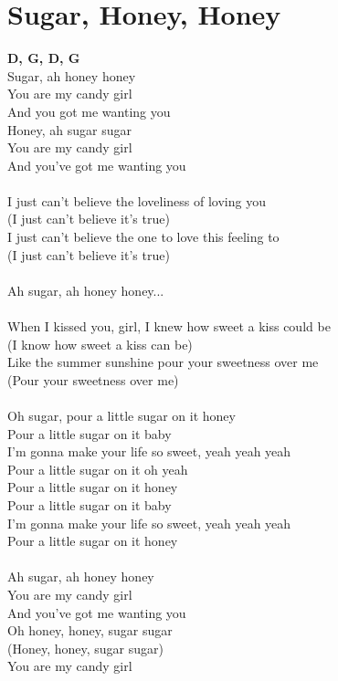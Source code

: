 \section{Sugar, Honey, Honey}
\footnotesize\textbf{D, G, D, G}\\
\normalsize
{}Sugar, ah honey honey\\
You are my candy girl\\
And you got me wanting you\\
Honey, ah sugar sugar\\
You are my candy girl\\
And you've got me wanting you\\
\\
I just can't believe the loveliness of loving you\\
(I just can't believe it's true)\\
I just can't believe the one to love this feeling to\\
(I just can't believe it's true)\\
\\
Ah sugar, ah honey honey...\\
\\
When I kissed you, girl, I knew how sweet a kiss could be\\
(I know how sweet a kiss can be)\\
Like the summer sunshine pour your sweetness over me\\
(Pour your sweetness over me)\\
\\
Oh sugar, pour a little sugar on it honey\\
Pour a little sugar on it baby\\
I'm gonna make your life so sweet, yeah yeah yeah\\
Pour a little sugar on it oh yeah\\
Pour a little sugar on it honey\\
Pour a little sugar on it baby\\
I'm gonna make your life so sweet, yeah yeah yeah\\
Pour a little sugar on it honey\\
\\
Ah sugar, ah honey honey\\
You are my candy girl\\
And you've got me wanting you\\
Oh honey, honey, sugar sugar\\
(Honey, honey, sugar sugar)\\
You are my candy girl